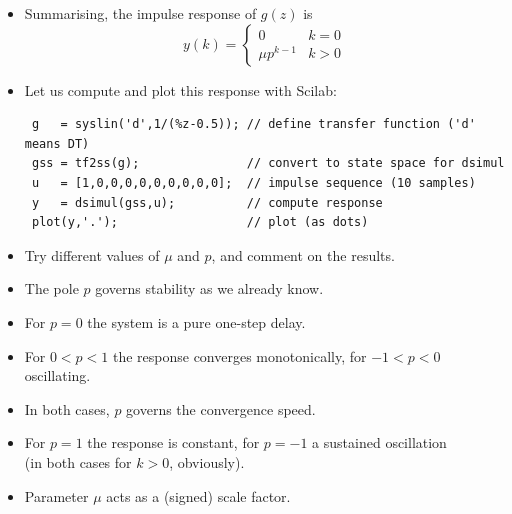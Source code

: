 \begin{frame}[fragile]
\myPause
 \begin{itemize}[<+-| alert@+>]
 \item Summarising, the impulse response of $g(z)$ is
       \begin{displaymath}
        y(k) = \begin{cases}
                0           & k=0 \\
                \mu p^{k-1} & k>0
               \end{cases}
       \end{displaymath}
 \item Let us compute and plot this response with Scilab:
       {\small
       \begin{verbatim}
 g   = syslin('d',1/(%z-0.5)); // define transfer function ('d' means DT)
 gss = tf2ss(g);               // convert to state space for dsimul
 u   = [1,0,0,0,0,0,0,0,0,0];  // impulse sequence (10 samples)
 y   = dsimul(gss,u);          // compute response
 plot(y,'.');                  // plot (as dots)
       \end{verbatim}
       }
 \item Try different values of $\mu$ and $p$, and comment on the results.
 \end{itemize}
\end{frame}

\begin{frame}
\myPause
 \begin{itemize}[<+-| alert@+>]
 \item The pole $p$ governs stability as we already know.
 \item For $p=0$ the system is a pure one-step delay.
 \item For $0<p<1$ the response converges monotonically, for $-1<p<0$ oscillating.
 \item In both cases, $p$ governs the convergence speed.
 \item For $p=1$ the response is constant, for $p=-1$ a sustained oscillation\\
       (in both cases for $k>0$, obviously).
 \item Parameter $\mu$ acts as a (signed) scale factor.
 \end{itemize}
\end{frame}

